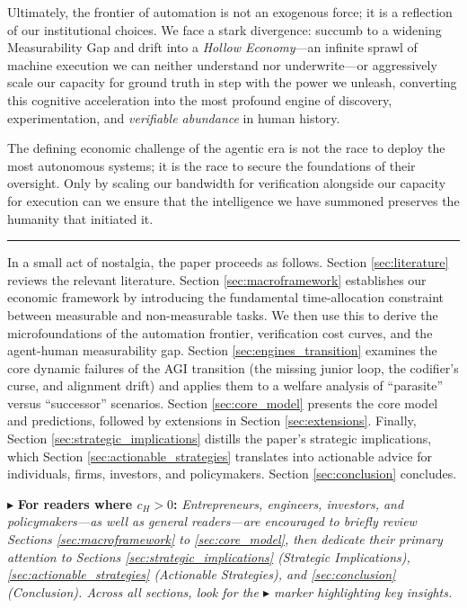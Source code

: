 \documentclass[12pt, letter]{article}
\begin{document}
Ultimately, the frontier of automation is not an exogenous force; it is a reflection of our institutional choices. We face a stark divergence: succumb to a widening Measurability Gap and drift into a \emph{Hollow Economy}---an infinite sprawl of machine execution we can neither understand nor underwrite---or aggressively scale our capacity for ground truth in step with the power we unleash, converting this cognitive acceleration into the most profound engine of discovery, experimentation, and \emph{verifiable abundance} in human history.

The defining economic challenge of the agentic era is not the race to deploy the most autonomous systems; it is the race to secure the foundations of their oversight. Only by scaling our bandwidth for verification alongside our capacity for execution can we ensure that the intelligence we have summoned preserves the humanity that initiated it.


\vspace{0.5cm}
\hrule
\vspace{0.5cm}

In a small act of nostalgia, the paper proceeds as follows. Section \ref{sec:literature} reviews the relevant literature. Section \ref{sec:macroframework} establishes our economic framework by introducing the fundamental time-allocation constraint between measurable and non-measurable tasks. We then use this to derive the microfoundations of the automation frontier, verification cost curves, and the agent-human measurability gap. Section \ref{sec:engines_transition} examines the core dynamic failures of the AGI transition (the missing junior loop, the codifier's curse, and alignment drift) and applies them to a welfare analysis of ``parasite'' versus ``successor'' scenarios. Section \ref{sec:core_model} presents the core model and predictions, followed by extensions in Section \ref{sec:extensions}. Finally, Section \ref{sec:strategic_implications} distills the paper's strategic implications, which Section \ref{sec:actionable_strategies} translates into actionable advice for individuals, firms, investors, and policymakers. Section \ref{sec:conclusion} concludes. 

\clearpage

\noindent $\blacktriangleright$ \textbf{For readers where $c_H > 0$:} \textit{Entrepreneurs, engineers, investors, and policymakers—as well as general readers—are encouraged to briefly review Sections \ref{sec:macroframework} to \ref{sec:core_model}, then dedicate their primary attention to Sections \ref{sec:strategic_implications} (Strategic Implications), \ref{sec:actionable_strategies} (Actionable Strategies), and \ref{sec:conclusion} (Conclusion). Across all sections, look for the $\blacktriangleright$ marker highlighting key insights.}
\end{document}
